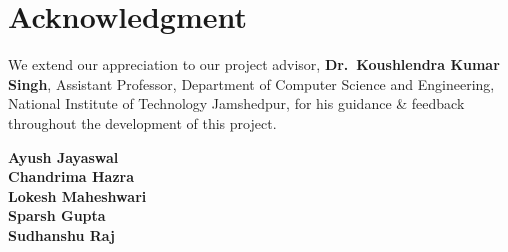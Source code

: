 \chapter*{\huge Acknowledgment}
\noindent
We extend our appreciation to our project advisor, \textbf{Dr.\ Koushlendra Kumar Singh}, Assistant Professor, Department of Computer Science and Engineering, National Institute of Technology Jamshedpur, for his guidance \& feedback throughout the development of this project.

\vspace{0.5in}
\begin{flushright}
\textbf{Ayush Jayaswal}\\
\textbf{Chandrima Hazra}\\
\textbf{Lokesh Maheshwari}\\
\textbf{Sparsh Gupta}\\
\textbf{Sudhanshu Raj}
\end{flushright}
